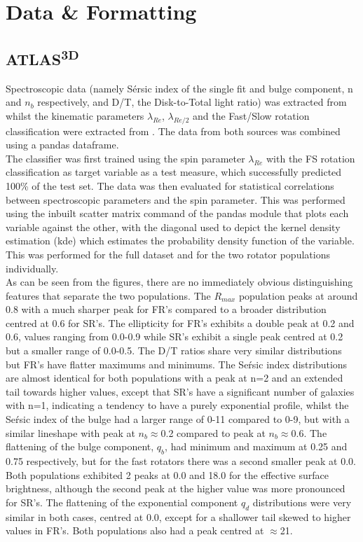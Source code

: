 \section{Data \& Formatting}
\subsection{ATLAS\textsuperscript{3D}}
Spectroscopic data (namely S\'ersic index of the single fit and bulge component, n and $n_{b}$ respectively,  and D/T, the Disk-to-Total light ratio) was extracted from \cite{Krajnovic2013} whilst the kinematic parameters $\lambda_{Re}$, $\lambda_{Re/2}$ and the Fast/Slow rotation classification were extracted from \cite{Emsellem2011}. The data from both sources was combined using a pandas dataframe.\\
The classifier was first trained using the spin parameter $\lambda_{Re}$ with the FS rotation classification as target variable as a test measure, which successfully predicted 100\% of the test set. The data was then evaluated for statistical correlations between spectroscopic parameters and the spin parameter. This was performed using the inbuilt scatter matrix command of the pandas module that plots each variable against the other, with the diagonal used to depict the kernel density estimation (kde) which estimates the probability density function of the variable. This was performed for the full dataset and for the two rotator populations individually.\\As can be seen from the figures, there are no immediately obvious distinguishing features that separate the two populations. The $R_{max}$ population peaks at around 0.8 with a much sharper peak for FR's compared to a broader distribution centred at 0.6 for SR's. The ellipticity for FR's exhibits a double peak at 0.2 and 0.6, values ranging from 0.0-0.9 while SR's exhibit a single peak centred at 0.2 but a smaller range of 0.0-0.5. The D/T ratios share very similar distributions but FR's have flatter maximums and minimums. The Se\'rsic index distributions are almost identical for both populations with a peak at n=2 and an extended tail towards higher values, except that SR's have a significant number of galaxies with n=1, indicating a tendency to have a purely exponential profile, whilst the Se\'rsic index of the bulge had a larger range of 0-11 compared to 0-9, but with a similar lineshape with peak at $n_{b}\approx$0.2 compared to peak at $n_{b}\approx$0.6. The flattening of the bulge component, $q_{b}$, had minimum and maximum at 0.25 and 0.75 respectively, but for the fast rotators there was a second smaller peak at 0.0. Both populations exhibited 2 peaks at 0.0 and 18.0 for the effective surface brightness, although the second peak at the higher value was more pronounced for SR's. The flattening of the exponential component $q_{d}$ distributions were very similar in both cases, centred at 0.0, except for a shallower tail skewed to higher values in FR's. Both populations also had a peak centred at $\approx$21. \\
